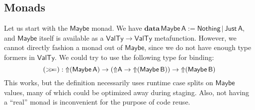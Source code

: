 \documentclass[acmsmall,screen,review,anonymous]{acmart}
\newcommand{\msf}[1]{{\mathsf{#1}}}
\newcommand{\mbf}[1]{{\mathbf{#1}}}
\newcommand{\data}{\mbf{data}\,}
\newcommand{\vA}{\mathsf{A}}
\newcommand{\vB}{\mathsf{B}}
\newcommand{\Up}{{\Uparrow}}
\newcommand{\bind}{\mathbin{>\!\!>\mkern-6.7mu=}}
\newcommand{\VTy}{\msf{ValTy}}
\newcommand{\Maybe}{\msf{Maybe}}
\newcommand{\Nothing}{\msf{Nothing}}
\newcommand{\Just}{\msf{Just}}
\theoremstyle{remark}
\begin{document}
\subsection{Monads}\label{sec:monads}

Let us start with the $\Maybe$ monad. We have $\data \Maybe\,\vA :=
\Nothing\,|\,\Just\,\vA$, and $\Maybe$ itself is available as a $\VTy \to \VTy$
metafunction. However, we cannot directly fashion a monad out of $\Maybe$, since
we do not have enough type formers in $\VTy$. We could try to use the following
type for binding:
\[ (\bind) : \Up(\Maybe\,\vA) \to (\Up\vA \to \Up(\Maybe\,\vB)) \to \Up(\Maybe\,\vB) \]
This works, but the definition necessarily uses runtime case splits on $\Maybe$
values, many of which could be optimized away during staging. Also, not having
a ``real'' monad is inconvenient for the purpose of code reuse.
\end{document}
